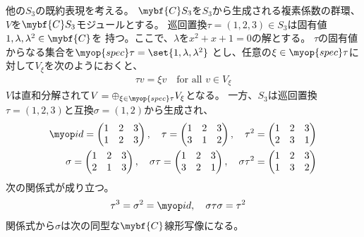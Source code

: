 	他の$S_3$の既約表現を考える。
	$\mybf{C}S_3$を$S_3$から生成される複素係数の群環、
	$V$を$\mybf{C}S_3$モジュールとする。
	巡回置換$\tau=(1,2,3)\in S_3$は固有値$1,\lambda,\lambda^2\in\mybf{C}$を
	持つ。ここで、$\lambda$を$x^2+x+1=0$の解とする。
	$\tau$の固有値からなる集合を$\myop{spec}\tau=\set{1,\lambda,\lambda^2}$
	とし、任意の$\xi\in\myop{spec}\tau$に対して$V_\xi$を次のようにおくと、
	\begin{equation*}\begin{split} %
		\tau v = \xi v \quad\text{for all }v\in V_\xi
	\end{split}\end{equation*} %
	$V$は直和分解されて$V=\oplus_{\xi\in\myop{spec}\tau}V_\xi$となる。
	一方、$S_3$は巡回置換$\tau=(1,2,3)$と互換$\sigma=(1,2)$から生成され、
	\begin{equation*}\begin{split} %
		\myid = \begin{pmatrix}
			1 & 2 & 3 \\ 1 & 2 & 3
		\end{pmatrix},\quad \tau = \begin{pmatrix}
			1 & 2 & 3 \\ 3 & 1 & 2
		\end{pmatrix},\quad \tau^2 = \begin{pmatrix}
			1 & 2 & 3 \\ 2 & 3 & 1
		\end{pmatrix} \\
	\sigma = \begin{pmatrix}
			1 & 2 & 3 \\ 2 & 1 & 3
		\end{pmatrix},\quad \sigma\tau = \begin{pmatrix}
			1 & 2 & 3 \\ 3 & 2 & 1
		\end{pmatrix},\quad \sigma\tau^2 = \begin{pmatrix}
			1 & 2 & 3 \\ 1 & 3 & 2
		\end{pmatrix} \\
	\end{split}\end{equation*} %
	次の関係式が成り立つ。
	\begin{equation*}\begin{split} %
		\tau^3&= \sigma^2 = \myid,\quad \sigma\tau\sigma = \tau^2
	\end{split}\end{equation*} %
	関係式から$\sigma$は次の同型な$\mybf{C}$線形写像になる。
